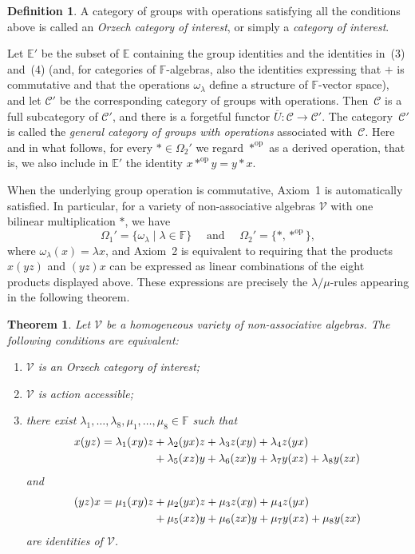 \documentclass[reqno,a4paper]{amsart}
\theoremstyle{plain}
\newtheorem{theorem}[subsection]{Theorem}
\theoremstyle{definition}
\newtheorem{definition}[subsection]{Definition}
\theoremstyle{remark}
\numberwithin{equation}{section}
\newcommand{\cC}{\ensuremath{\mathcal{C}}}
\newcommand{\F}{\mathbb{F}}
\newcommand{\V}{\mathcal{V}}
\DeclareMathOperator{\op}{op}
\begin{document}
\begin{definition}\cite{Orzech}\label{DefCategoryInterest}
A category of groups with operations satisfying all the conditions above is called an \emph{Orzech category of interest}, or simply a \emph{category of interest}.
\end{definition}

Let $\mathbb{E}'$ be the subset of $\mathbb{E}$ containing the group identities and the identities in~(3) and~(4) (and, for categories of $\F$-algebras, also the identities expressing that $+$ is commutative and that the operations $\omega_\lambda$ define a structure of $\F$-vector space), and let $\cC'$ be the corresponding category of groups with operations. Then~$\cC$ is a full subcategory of $\cC'$, and there is a forgetful functor $\overline{U}\colon\cC\to\cC'$. The category~$\cC'$ is called the \emph{general category of groups with operations} associated with~$\cC$. Here and in what follows, for every $*\in\Omega_2'$ we regard $*^{\op}$ as a derived operation, that is, we also include in $\mathbb{E}'$ the identity $x*^{\op}y=y*x$.

When the underlying group operation is commutative, Axiom~1 is automatically satisfied. In particular, for a variety of non-associative algebras $\V$ with one bilinear multiplication $*$, we have
\[
\Omega_1'=\{\omega_\lambda\mid\lambda\in\F\} \quad \text{ and } \quad \Omega_2'=\{*,*^{\op}\},
\]
where $\omega_\lambda(x)=\lambda x$, and Axiom~2 is equivalent to requiring that the products $x(yz)$ and $(yz)x$ can be expressed as linear combinations of the eight products displayed above. These expressions are precisely the $\lambda/\mu$-rules appearing in the following theorem.

\begin{theorem}\cite{XabiTim,Coco_Thesis}\label{ThmLambdaMu}
Let $\V$ be a homogeneous variety of non-associative algebras. The following conditions are equivalent:
\begin{enumerate}
\item $\V$ is an Orzech category of interest;
\item $\V$ is action accessible;
\item there exist $\lambda_1,\ldots,\lambda_8,\mu_1,\ldots,\mu_8\in\F$ such that
\begin{align}
x(yz)=\lambda_1(xy)z &+\lambda_2(yx)z+\lambda_3z(xy)+\lambda_4z(yx)\notag\\
&+\lambda_5(xz)y+\lambda_6(zx)y+\lambda_7y(xz)+\lambda_8y(zx)\label{LambdaRule}
\end{align}
and
\begin{align}
(yz)x=\mu_1(xy)z &+\mu_2(yx)z+\mu_3z(xy)+\mu_4z(yx)\notag\\
&+\mu_5(xz)y+\mu_6(zx)y+\mu_7y(xz)+\mu_8y(zx)\label{MuRule}
\end{align}
are identities of $\V$.
\end{enumerate}
\end{theorem}
\end{document}
